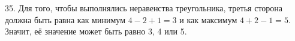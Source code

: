 35. Для того, чтобы выполнялись неравенства треугольника, третья сторона должна быть равна как минимум $4-2+1=3$ и как максимум $4+2-1=5.$ Значит, её значение может быть равно 3, 4 или 5.\\
